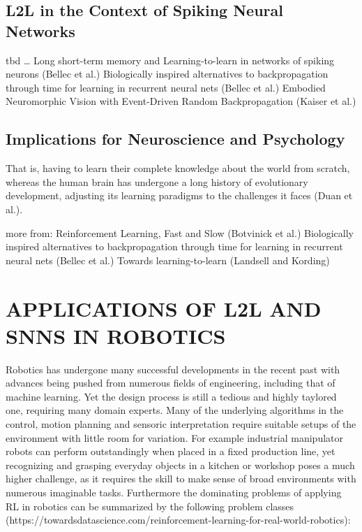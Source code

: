 \documentclass[letterpaper, 10 pt, conference]{ieeeconf}  %
\begin{document}
\subsection{L2L in the Context of Spiking Neural Networks}

tbd \dots
Long short-term memory and Learning-to-learn in networks of spiking neurons (Bellec et al.)
Biologically inspired alternatives to backpropagation through time for learning in recurrent neural nets (Bellec et al.)
Embodied Neuromorphic Vision with Event-Driven Random Backpropagation (Kaiser et al.)

\subsection{Implications for Neuroscience and Psychology}
That is, having to learn their complete knowledge about the world from scratch, whereas the human brain has undergone a long history of evolutionary
development, adjusting its learning paradigms to the challenges it faces (Duan et al.). \newline

more from: \newline
Reinforcement Learning, Fast and Slow (Botvinick et al.) \newline
Biologically inspired alternatives to backpropagation through time for learning in recurrent neural nets (Bellec et al.) \newline
Towards learning-to-learn (Landsell and Kording) \newline

\section{APPLICATIONS OF L2L AND SNNS IN ROBOTICS}

Robotics has undergone many successful developments in the recent past with advances being pushed from 
numerous fields of engineering, including that of machine learning. Yet the design process is still a tedious and 
highly taylored one, requiring many domain experts. Many of the underlying algorithms in 
the control, motion planning and sensoric interpretation require suitable setups of the environment with little room
for variation. For example industrial manipulator robots can perform outstandingly when placed in a fixed production line, yet 
recognizing and grasping everyday objects in a kitchen or workshop poses a much higher challenge, as it requires the skill to 
make sense of broad environments with numerous imaginable tasks. Furthermore the dominating problems of applying RL in 
robotics can be summarized by the following problem classes (https://towardsdatascience.com/reinforcement-learning-for-real-world-robotics):
\end{document}
